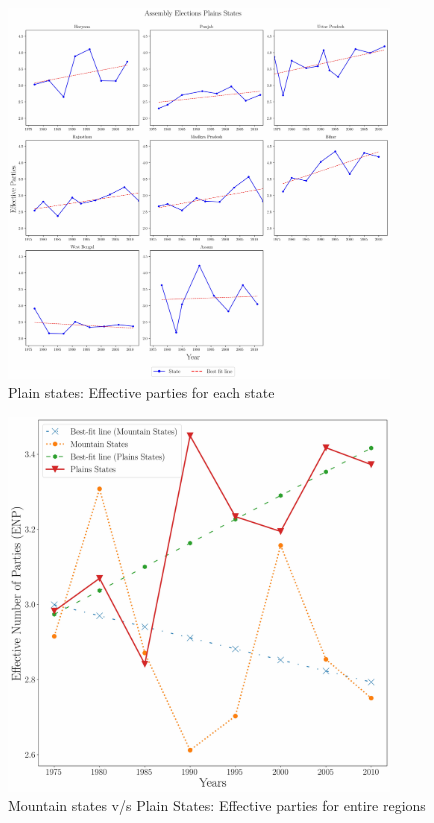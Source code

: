 \begin{figure}[htbp]
    \centering
    \includegraphics[width=0.9\textwidth]{figures/assembly/assembly_elections_plains_states.pdf}
    \caption{Plain states: Effective parties for each state}
    \label{img:assembly_plain_enp}
\end{figure}

\begin{figure}[htbp]
    \centering
    \includegraphics[width=0.9\textwidth]{figures/assembly/assembly_final_adjusted.pdf}
    \caption{Mountain states v/s Plain States: Effective parties for entire regions}
    \label{img:assembly_overall_enp}
\end{figure}

